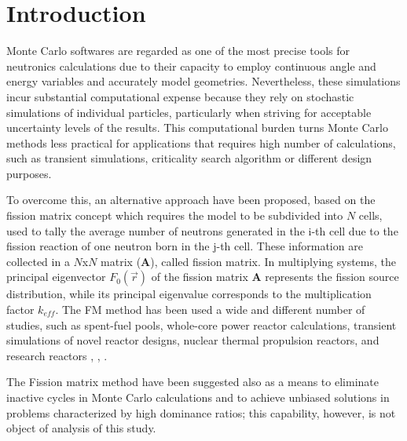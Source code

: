 \documentclass[preprint,review,12pt]{elsarticle}
\begin{document}


\section{Introduction} \label{section:Introduction}

Monte Carlo softwares are regarded as one of the most precise tools for neutronics calculations due to their capacity to employ continuous angle and energy variables and accurately model geometries. Nevertheless, these simulations incur substantial computational expense because they rely on stochastic simulations of individual particles, particularly when striving for acceptable uncertainty levels of the results. This computational burden turns Monte Carlo methods less practical for applications that requires high number of calculations, such as transient simulations, criticality search algorithm or different design purposes.

To overcome this, an alternative approach have been proposed, based on the fission matrix concept which requires the model to be subdivided into $N$ cells, used to tally the average number of neutrons generated in the i-th cell due to the fission reaction of one neutron born in the j-th cell. These information are collected in a $N$x$N$ matrix ($\textbf{A}$), called fission matrix.  In multiplying systems, the principal eigenvector $F_0(\vec{r})$ of the fission matrix $\textbf{A}$ represents the fission source distribution, while its principal eigenvalue corresponds to the multiplication factor $k_{eff}$.
The FM method has been used a wide and different number of studies, such as spent-fuel pools, whole-core power reactor calculations, transient simulations of novel reactor designs, nuclear thermal propulsion reactors, and research reactors \cite{Walters2018}, \cite{Wang2018}, \cite{Mascolino2022}.

The Fission matrix method have been suggested also as a means to eliminate inactive cycles in Monte Carlo calculations and to achieve unbiased solutions in problems characterized by high dominance ratios; this capability, however, is not object of analysis of this study.
\end{document}
